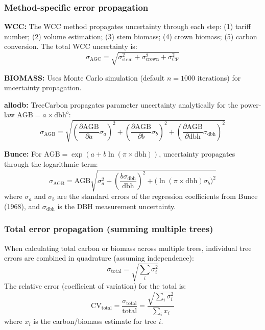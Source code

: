 \documentclass[12pt,a4paper]{article}
\begin{document}
\subsubsection{Method-specific error propagation}

\textbf{WCC:} The WCC method propagates uncertainty through each step: (1) tariff number; (2) volume estimation; (3) stem biomass; (4) crown biomass; (5) carbon conversion. The total WCC uncertainty is:
\begin{equation}
  \sigma_{\text{AGC}} = \sqrt{\sigma_{\text{stem}}^2 + \sigma_{\text{crown}}^2 + \sigma_{\text{CF}}^2}
\end{equation}

\textbf{BIOMASS:} Uses Monte Carlo simulation (default $n = 1000$ iterations) for uncertainty propagation.

\textbf{allodb:} TreeCarbon propagates parameter uncertainty analytically for the power-law $\text{AGB} = a \times \text{dbh}^b$:
\begin{equation}
  \sigma_{\text{AGB}} = \sqrt{\left(\frac{\partial\text{AGB}}{\partial a} \sigma_a\right)^2 + \left(\frac{\partial\text{AGB}}{\partial b} \sigma_b\right)^2 + \left(\frac{\partial\text{AGB}}{\partial\text{dbh}} \sigma_{\text{dbh}}\right)^2}
\end{equation}

\textbf{Bunce:} For $\text{AGB} = \exp(a + b \ln(\pi \times \text{dbh}))$, uncertainty propagates through the logarithmic term:
\begin{equation}
  \sigma_{\text{AGB}} = \text{AGB} \sqrt{\sigma_a^2 + \left(\frac{b \sigma_{\text{dbh}}}{\text{dbh}}\right)^2 + \bigl(\ln(\pi \times \text{dbh}) \sigma_b\bigr)^2}
\end{equation}
where $\sigma_a$ and $\sigma_b$ are the standard errors of the regression coefficients from Bunce (1968), and $\sigma_{\text{dbh}}$ is the DBH measurement uncertainty.

\subsubsection{Total error propagation (summing multiple trees)}

When calculating total carbon or biomass across multiple trees, individual tree errors are combined in quadrature (assuming independence):
\begin{equation}
  \sigma_{\text{total}} = \sqrt{\sum_i \sigma_i^2}
\end{equation}
The relative error (coefficient of variation) for the total is:
\begin{equation}
  \text{CV}_{\text{total}} = \frac{\sigma_{\text{total}}}{\text{total}} = \frac{\sqrt{\sum_i \sigma_i^2}}{\sum_i x_i}
\end{equation}
where $x_i$ is the carbon/biomass estimate for tree $i$.
\end{document}
